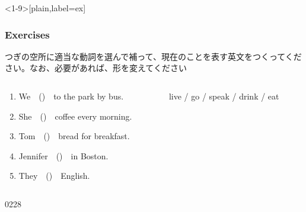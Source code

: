 \documentclass[aspectratio=169,xcolor={dvipsnames,table}]{beamer}
\newcommand{\myaudio}[1]{\href{#1}{\faVolumeUp}}
\begin{document}
\begin{frame}<1-9>[plain,label=ex]\frametitle{Exercises}
つぎの空所に適当な動詞を選んで補って、現在のことを表す英文をつくってください。なお、必要があれば、形を変えてください

\begin{columns}
\begin{column}{.5\textwidth}
  \begin{enumerate}
   \item We~~()~~to the park by bus.
   \item  She~~()~~coffee every morning.
   \item Tom~~()~~bread for breakfast.
   \item Jennifer~~()~~in Boston.
   \item They~~()~~English.
  \end{enumerate}
\end{column}
\begin{column}{.45\textwidth}
\begin{tcolorbox}[title=この中から選んでください]
live / go / speak / drink / eat
\end{tcolorbox}
\end{column}
\end{columns}

\bigskip

\mbox{}\hfill{\tiny 0228}\,{\scriptsize \myaudio{audio/004_verb_03.mp3}}

\end{frame}
\end{document}
